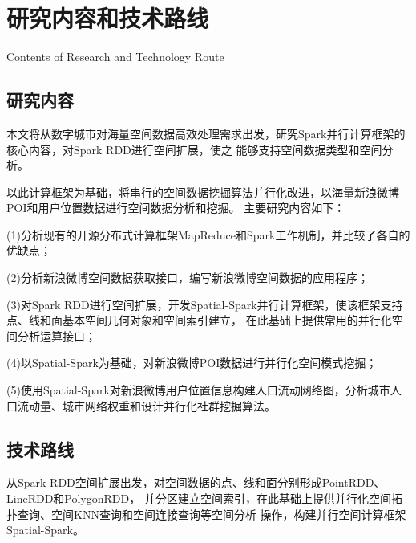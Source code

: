 \section{研究内容和技术路线}{Contents of Research and Technology Route}
\subsection{研究内容}
本文将从数字城市对海量空间数据高效处理需求出发，研究Spark并行计算框架的核心内容，对Spark RDD进行空间扩展，使之
能够支持空间数据类型和空间分析。

以此计算框架为基础，将串行的空间数据挖掘算法并行化改进，以海量新浪微博POI和用户位置数据进行空间数据分析和挖掘。
主要研究内容如下：

(1)分析现有的开源分布式计算框架MapReduce和Spark工作机制，并比较了各自的优缺点；

(2)分析新浪微博空间数据获取接口，编写新浪微博空间数据的应用程序；

(3)对Spark RDD进行空间扩展，开发Spatial-Spark并行计算框架，使该框架支持点、线和面基本空间几何对象和空间索引建立，
在此基础上提供常用的并行化空间分析运算接口；

(4)以Spatial-Spark为基础，对新浪微博POI数据进行并行化空间模式挖掘；

(5)使用Spatial-Spark对新浪微博用户位置信息构建人口流动网络图，分析城市人口流动量、城市网络权重和设计并行化社群挖掘算法。

\subsection{技术路线}
从Spark RDD空间扩展出发，对空间数据的点、线和面分别形成PointRDD、LineRDD和PolygonRDD，
并分区建立空间索引，在此基础上提供并行化空间拓扑查询、空间KNN查询和空间连接查询等空间分析
操作，构建并行空间计算框架Spatial-Spark。

